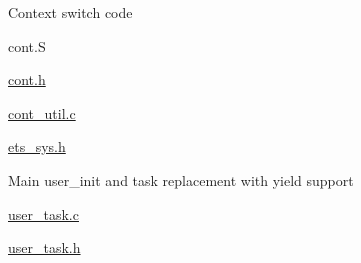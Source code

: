 \begin{DoxyItemize}
\begin{DoxyItemize}
\item Context switch code
\begin{DoxyItemize}
\item cont.\+S
\item \hyperlink{cont_8h}{cont.\+h}
\item \hyperlink{cont__util_8c}{cont\+\_\+util.\+c}
\item \hyperlink{ets__sys_8h}{ets\+\_\+sys.\+h}
\end{DoxyItemize}
\item Main user\+\_\+init and task replacement with yield support
\begin{DoxyItemize}
\item \hyperlink{user__task_8c}{user\+\_\+task.\+c}
\item \hyperlink{user__task_8h}{user\+\_\+task.\+h}
\end{DoxyItemize}
\end{DoxyItemize}
\end{DoxyItemize}

